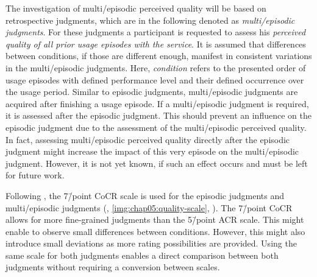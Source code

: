The investigation of multi\-/episodic perceived quality will be based on retrospective judgments, which are in the following denoted as \emph{multi\-/episodic judgments}.
For these judgments a participant is requested to assess his \emph{perceived quality of all prior usage episodes with the service}.
It is assumed that differences between conditions, if those are different enough, manifest in consistent variations in the multi\-/episodic judgments.
Here, \emph{condition} refers to the presented order of usage episodes with defined performance level and their defined occurrence over the usage period.
Similar to episodic judgments, multi\-/episodic judgments are acquired after finishing a usage episode.
If a multi\-/episodic judgment is required, it is assessed after the episodic judgment.
This should prevent an influence on the episodic judgment due to the assessment of the multi\-/episodic perceived quality.
In fact, assessing multi\-/episodic perceived quality directly after the episodic judgment might increase the impact of this very episode on the multi\-/episodic judgment.
However, it is not yet known, if such an effect occurs and must be left for future work.

Following \citet{moller_single-call_2011}, the 7\=/point \acf{CoCR} scale is used for the episodic judgments and multi\-/episodic judgments (\cf, \autoref{img:chap05:quality-scale}, ).
The 7\=/point \ac{CoCR} allows for more fine-grained judgments than the 5\=/point \ac{ACR} scale.
This might enable to observe small differences between conditions.
However, this might also introduce small deviations as more rating possibilities are provided.
Using the same scale for both judgments enables a direct comparison between both judgments without requiring a conversion between scales.

